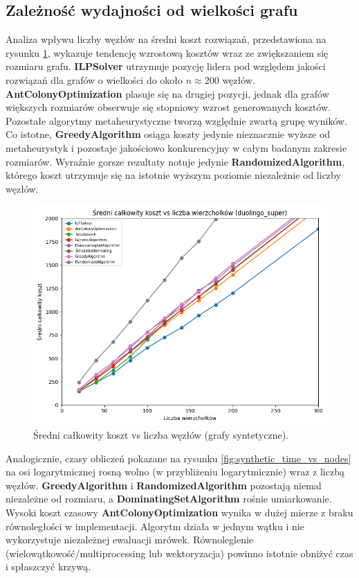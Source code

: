 \subsection{Zależność wydajności od wielkości grafu}

Analiza wpływu liczby węzłów na średni koszt rozwiązań, przedstawiona na rysunku \ref{fig:synthetic_cost_vs_nodes}, wykazuje tendencję wzrostową kosztów wraz ze zwiększaniem się rozmiaru grafu. \textbf{ILPSolver} utrzymuje pozycję lidera pod względem jakości rozwiązań dla grafów o wielkości do około $n \approx 200$ węzłów. \textbf{AntColonyOptimization} plasuje się na drugiej pozycji, jednak dla grafów większych rozmiarów obserwuje się stopniowy wzrost generowanych kosztów. Pozostałe algorytmy metaheurystyczne tworzą względnie zwartą grupę wyników. Co istotne, \textbf{GreedyAlgorithm} osiąga koszty jedynie nieznacznie wyższe od metaheurystyk i pozostaje jakościowo konkurencyjny w całym badanym zakresie rozmiarów. Wyraźnie gorsze rezultaty notuje jedynie \textbf{RandomizedAlgorithm}, którego koszt utrzymuje się na istotnie wyższym poziomie niezależnie od liczby węzłów.

\begin{figure}[H]
  \centering
  \includegraphics[width=0.7\linewidth]{assets/figures/synthetic_cost_vs_nodes.png}
  \caption{Średni całkowity koszt vs liczba węzłów (grafy syntetyczne).}
  \label{fig:synthetic_cost_vs_nodes}
\end{figure}

Analogicznie, czasy obliczeń pokazane na rysunku \ref{fig:synthetic_time_vs_nodes} na osi logarytmicznej rosną wolno (w przybliżeniu logarytmicznie) wraz z liczbą węzłów. \textbf{GreedyAlgorithm} i \textbf{RandomizedAlgorithm} pozostają niemal niezależne od rozmiaru, a \textbf{DominatingSetAlgorithm} rośnie umiarkowanie. Wysoki koszt czasowy \textbf{AntColonyOptimization} wynika w dużej mierze z braku równoległości w implementacji. Algorytm działa w jednym wątku i nie wykorzystuje niezależnej ewaluacji mrówek. Równoleglenie (wielowątkowość/multiprocessing lub wektoryzacja) powinno istotnie obniżyć czas i spłaszczyć krzywą.

